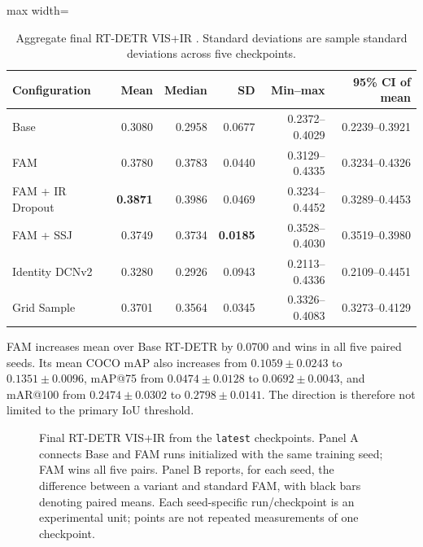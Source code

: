 \begin{table}[H]
  \centering
  \caption{Aggregate final RT-DETR VIS+IR \mapfifty{}. Standard deviations are
  sample standard deviations across five checkpoints.}
  \label{tab:rtdetr-aggregate}
  \begin{adjustbox}{max width=\textwidth}
  \begin{tabular}{lrrrrr}
    \toprule
    Configuration & Mean & Median & SD & Min--max & 95\% CI of mean \\
    \midrule
    Base & 0.3080 & 0.2958 & 0.0677 & 0.2372--0.4029 & 0.2239--0.3921 \\
    FAM & 0.3780 & 0.3783 & 0.0440 & 0.3129--0.4335 & 0.3234--0.4326 \\
    FAM + IR Dropout & \textbf{0.3871} & 0.3986 & 0.0469 & 0.3234--0.4452 & 0.3289--0.4453 \\
    FAM + SSJ & 0.3749 & 0.3734 & \textbf{0.0185} & 0.3528--0.4030 & 0.3519--0.3980 \\
    Identity DCNv2 & 0.3280 & 0.2926 & 0.0943 & 0.2113--0.4336 & 0.2109--0.4451 \\
    Grid Sample & 0.3701 & 0.3564 & 0.0345 & 0.3326--0.4083 & 0.3273--0.4129 \\
    \bottomrule
  \end{tabular}
  \end{adjustbox}
\end{table}

FAM increases mean \mapfifty{} over Base RT-DETR by 0.0700 and wins in all five
paired seeds. Its mean COCO mAP also increases from
\(0.1059\pm0.0243\) to \(0.1351\pm0.0096\), mAP@75 from
\(0.0474\pm0.0128\) to \(0.0692\pm0.0043\), and mAR@100 from
\(0.2474\pm0.0302\) to \(0.2798\pm0.0141\). The direction is therefore not
limited to the primary IoU threshold.

\begin{figure}[H]
  \centering
  \caption{Final RT-DETR VIS+IR \mapfifty{} from the \texttt{latest}
  checkpoints. Panel A connects Base and FAM runs initialized with the same
  training seed; FAM wins all five pairs. Panel B reports, for each seed, the
  difference between a variant and standard FAM, with black bars denoting
  paired means. Each seed-specific run/checkpoint is an experimental unit;
  points are not repeated measurements of one checkpoint.}
  \label{fig:rtdetr-paired-results}
\end{figure}

